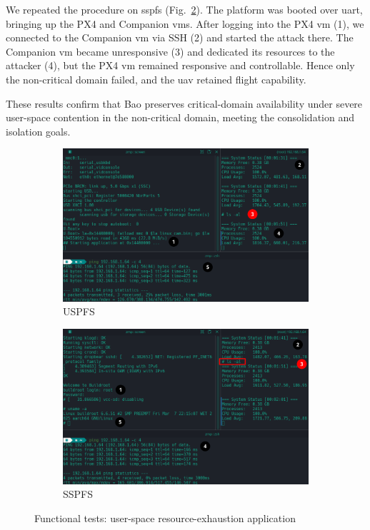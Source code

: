 We repeated the procedure on \gls{sspfs} (Fig.~\ref{fig:user-memhog-test-sspfs}). The platform was booted over \gls{uart}, bringing up the PX4 and Companion \glspl{vm}. After logging into the PX4 \gls{vm} (1), we connected to the Companion \gls{vm} via SSH (2) and started the attack there. The Companion \gls{vm} became unresponsive (3) and dedicated its resources to the attacker (4), but the PX4 \gls{vm} remained responsive and controllable. Hence only the non-critical domain failed, and the \gls{uav} retained flight capability.

These results confirm that Bao preserves critical-domain availability under severe user-space contention in the non-critical domain, meeting the consolidation and isolation goals.

\begin{figure}[!hbt]
  \centering
  \begin{subfigure}[t]{0.7\textwidth}
    \centering
    \includegraphics[width=1.0\textwidth]{./img/png/user-memhog-test-annot}
    \caption{USPFS}%
    \label{fig:user-memhog-test-uspfs}
  \end{subfigure}
  \begin{subfigure}[t]{0.7\textwidth}
    \centering
    \includegraphics[width=\linewidth]{./img/png/user-memhog-test-bao-annot}
    \caption{SSPFS}%
    \label{fig:user-memhog-test-sspfs}
  \end{subfigure}
  \caption{Functional tests: user-space resource-exhaustion application}
  \label{fig:user-memhog-test}
\end{figure}

